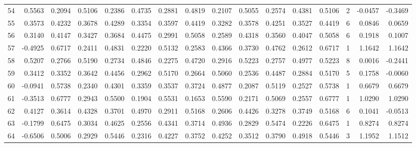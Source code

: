\begin{tabular}{lrrrrrrrrrrrrrrr}
54  &      0.5563 &  0.2094 &  0.5106 &  0.2386 &  0.4735 &  0.2881 &  0.4819 &  0.2107 &  0.5055 &  0.2574 &   0.4381 &     0.5106 &      2 &                   -0.0457 &                    -0.3469 \\
55  &      0.3573 &  0.4232 &  0.3678 &  0.4289 &  0.3354 &  0.3597 &  0.4419 &  0.3282 &  0.3578 &  0.4251 &   0.3527 &     0.4419 &      6 &                    0.0846 &                     0.0659 \\
56  &      0.3140 &  0.4147 &  0.3427 &  0.3684 &  0.4475 &  0.2991 &  0.5058 &  0.2589 &  0.4318 &  0.3560 &   0.4047 &     0.5058 &      6 &                    0.1918 &                     0.1007 \\
57  &     -0.4925 &  0.6717 &  0.2411 &  0.4831 &  0.2220 &  0.5132 &  0.2583 &  0.4366 &  0.3730 &  0.4762 &   0.2612 &     0.6717 &      1 &                    1.1642 &                     1.1642 \\
58  &      0.5207 &  0.2766 &  0.5190 &  0.2734 &  0.4846 &  0.2275 &  0.4720 &  0.2916 &  0.5223 &  0.2757 &   0.4977 &     0.5223 &      8 &                    0.0016 &                    -0.2441 \\
59  &      0.3412 &  0.3352 &  0.3642 &  0.4456 &  0.2962 &  0.5170 &  0.2664 &  0.5060 &  0.2536 &  0.4487 &   0.2884 &     0.5170 &      5 &                    0.1758 &                    -0.0060 \\
60  &     -0.0941 &  0.5738 &  0.2340 &  0.4301 &  0.3359 &  0.3537 &  0.3724 &  0.4877 &  0.2087 &  0.5119 &   0.2527 &     0.5738 &      1 &                    0.6679 &                     0.6679 \\
61  &     -0.3513 &  0.6777 &  0.2943 &  0.5500 &  0.1904 &  0.5531 &  0.1653 &  0.5590 &  0.2171 &  0.5069 &   0.2557 &     0.6777 &      1 &                    1.0290 &                     1.0290 \\
62  &      0.4127 &  0.3614 &  0.4328 &  0.3701 &  0.4970 &  0.2911 &  0.5168 &  0.2606 &  0.4426 &  0.3278 &   0.3749 &     0.5168 &      6 &                    0.1041 &                    -0.0513 \\
63  &     -0.1799 &  0.6475 &  0.3034 &  0.4625 &  0.2556 &  0.4341 &  0.3714 &  0.4936 &  0.2829 &  0.5474 &   0.2226 &     0.6475 &      1 &                    0.8274 &                     0.8274 \\
64  &     -0.6506 &  0.5006 &  0.2929 &  0.5446 &  0.2316 &  0.4227 &  0.3752 &  0.4252 &  0.3512 &  0.3790 &   0.4918 &     0.5446 &      3 &                    1.1952 &                     1.1512 \\

\end{tabular}
